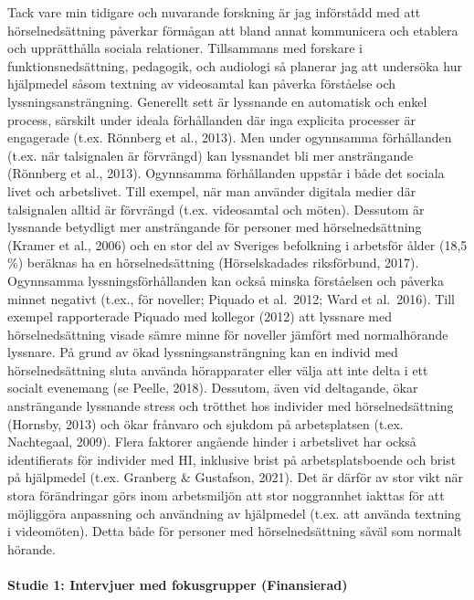 \documentclass[]{article}
\begin{document}
Tack vare min tidigare och nuvarande forskning är jag införstådd med att
hörselnedsättning påverkar förmågan att bland annat kommunicera och
etablera och upprätthålla sociala relationer. Tillsammans med forskare i
funktionsnedsättning, pedagogik, och audiologi så planerar jag att
undersöka hur hjälpmedel såsom textning av videosamtal kan påverka
förståelse och lyssningsansträngning. Generellt sett är lyssnande en
automatisk och enkel process, särskilt under ideala förhållanden där
inga explicita processer är engagerade (t.ex. Rönnberg et al., 2013).
Men under ogynnsamma förhållanden (t.ex. när talsignalen är förvrängd)
kan lyssnandet bli mer ansträngande (Rönnberg et al., 2013). Ogynnsamma
förhållanden uppstår i både det sociala livet och arbetslivet. Till
exempel, när man använder digitala medier där talsignalen alltid är
förvrängd (t.ex. videosamtal och möten). Dessutom är lyssnande betydligt
mer ansträngande för personer med hörselnedsättning (Kramer et al.,
2006) och en stor del av Sveriges befolkning i arbetsför ålder (18,5 \%)
beräknas ha en hörselnedsättning (Hörselskadades riksförbund, 2017).
Ogynnsamma lyssningsförhållanden kan också minska förståelsen och
påverka minnet negativt (t.ex., för noveller; Piquado et al.~2012; Ward
et al.~2016). Till exempel rapporterade Piquado med kollegor (2012) att
lyssnare med hörselnedsättning visade sämre minne för noveller jämfört
med normalhörande lyssnare. På grund av ökad lyssningsansträngning kan
en individ med hörselnedsättning sluta använda hörapparater eller välja
att inte delta i ett socialt evenemang (se Peelle, 2018). Dessutom, även
vid deltagande, ökar ansträngande lyssnande stress och trötthet hos
individer med hörselnedsättning (Hornsby, 2013) och ökar frånvaro och
sjukdom på arbetsplatsen (t.ex. Nachtegaal, 2009). Flera faktorer
angående hinder i arbetslivet har också identifierats för individer med
HI, inklusive brist på arbetsplatsboende och brist på hjälpmedel (t.ex.
Granberg \& Gustafson, 2021). Det är därför av stor vikt när stora
förändringar görs inom arbetsmiljön att stor noggrannhet iakttas för att
möjliggöra anpassning och användning av hjälpmedel (t.ex. att använda
textning i videomöten). Detta både för personer med hörselnedsättning
såväl som normalt hörande.

\hypertarget{studie-1-intervjuer-med-fokusgrupper-finansierad}{%
\paragraph{Studie 1: Intervjuer med fokusgrupper
(Finansierad)}\label{studie-1-intervjuer-med-fokusgrupper-finansierad}}
\end{document}
